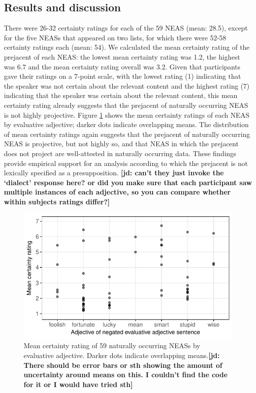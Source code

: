 \documentclass[11pt,fleqn]{article}
\newcommand{\6}{\mbox{$[\hspace*{-.6mm}[$}}
\newcommand{\9}{\mbox{$]\hspace*{-.6mm}]$}}
\newcommand{\jd}[1]{\textbf{\color{green}[jd: #1]}}
\begin{document}
\subsection{Results and discussion}

There were 26-32 certainty ratings for each of the 59 NEAS (mean: 28.5), except for the five NEASs that appeared on two lists, for which there were 52-58 certainty ratings each (mean: 54). We calculated the mean certainty rating of the prejacent of each NEAS: the lowest mean certainty rating was 1.2, the highest was 6.7 and the mean certainty rating overall was 3.2. Given that participants gave their ratings on a 7-point scale, with the lowest rating (1) indicating that the speaker was not certain about the relevant content and the highest rating (7) indicating that the speaker was certain about the relevant content, this mean certainty rating already suggests that the prejacent of naturally occurring NEAS is not highly projective. Figure \ref{f-corpus} shows the mean certainty ratings of each NEAS by evaluative adjective; darker dots indicate overlapping means. The distribution of mean certainty ratings again suggests that the prejacent of naturally occurring NEAS is projective, but not highly so, and that NEAS in which the prejacent does not project are well-attested in naturally occurring data. These findings provide empirical support for an analysis according to which the prejacent is not lexically specified as a presupposition. \jd{can't they just invoke the `dialect' response here? or did you make sure that each participant saw multiple instances of each adjective, so you can compare whether within subjects ratings differ?}

\begin{figure}[h!]
\centering

\includegraphics[width=.7\paperwidth]{../corpus-study/graphs/mean-response-by-item-and-adj}

\caption{Mean certainty rating of 59 naturally occurring NEASs by evaluative adjective. Darker dots indicate overlapping means.\jd{There should be error bars or sth showing the amount of uncertainty around means on this. I couldn't find the code for it or I would have tried sth}}\label{f-corpus}

\end{figure}
\end{document}
